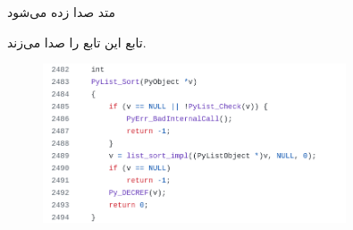 \begin{frame}{متد صدا زده می‌شود}
\begin{flushright}
تابع 
این تابع را صدا می‌زند.
\end{flushright}
\begin{figure}[H]
\begin{center}
\includegraphics[width=0.8\textwidth, height=0.6\textheight]{docs/images/PyList_Sort}
\end{center}
\end{figure}
\end{frame}


